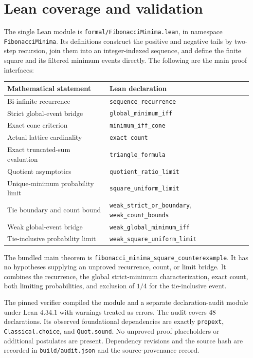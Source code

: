\documentclass[11pt]{article}
\begin{document}
\section{Lean coverage and validation}
The single Lean module is \texttt{formal/FibonacciMinima.lean}, in namespace \texttt{FibonacciMinima}. Its definitions construct the positive and negative tails by two-step recursion, join them into an integer-indexed sequence, and define the finite square and its filtered minimum events directly. The following are the main proof interfaces:
\begin{center}
\begin{tabular}{ll}
Mathematical statement & Lean declaration\\\hline
Bi-infinite recurrence & \texttt{sequence\_recurrence}\\
Strict global-event bridge & \texttt{global\_minimum\_iff}\\
Exact cone criterion & \texttt{minimum\_iff\_cone}\\
Actual lattice cardinality & \texttt{exact\_count}\\
Exact truncated-sum evaluation & \texttt{triangle\_formula}\\
Quotient asymptotics & \texttt{quotient\_ratio\_limit}\\
Unique-minimum probability limit & \texttt{square\_uniform\_limit}\\
Tie boundary and count bound & \texttt{weak\_strict\_or\_boundary}, \texttt{weak\_count\_bounds}\\
Weak global-event bridge & \texttt{weak\_global\_minimum\_iff}\\
Tie-inclusive probability limit & \texttt{weak\_square\_uniform\_limit}
\end{tabular}
\end{center}
The bundled main theorem is \texttt{fibonacci\_minima\_square\_counterexample}. It has no hypotheses supplying an unproved recurrence, count, or limit bridge. It combines the recurrence, the global strict-minimum characterization, exact count, both limiting probabilities, and exclusion of $1/4$ for the tie-inclusive event.

The pinned verifier compiled the module and a separate declaration-audit module under Lean 4.34.1 with warnings treated as errors. The audit covers 48 declarations. Its observed foundational dependencies are exactly \texttt{propext}, \texttt{Classical.choice}, and \texttt{Quot.sound}. No unproved proof placeholders or additional postulates are present. Dependency revisions and the source hash are recorded in \texttt{build/audit.json} and the source-provenance record.
\end{document}
